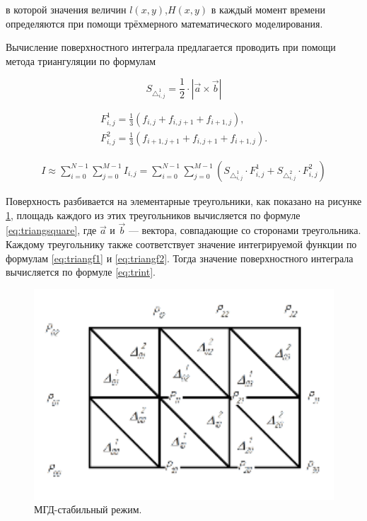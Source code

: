 \documentclass{article}
\begin{document}
в которой значения величин $l(x,y)$,$ H(x,y)$ в каждый момент времени определяются при помощи трёхмерного математического моделирования.

Вычисление поверхностного интеграла предлагается проводить при помощи метода триангуляции по формулам 

\begin{equation}
{S_{\triangle_{i,j}^1}} = \frac{1}{2} \cdot |\overrightarrow{a} \times \overrightarrow{b}|
\end{equation} \label{eq:triangsquare}

\begin{align}
F^1_{i,j} = \frac{1}{3}(f_{i,j}+f_{i,j+1}+f_{i+1,j}), \label{eq:triangf1}\\
F^2_{i,j} = \frac{1}{3}(f_{i+1,j+1}+f_{i,j+1}+f_{i+1,j}). \label{eq:triangf2}
\end{align}

\begin{align}\label{eq:trint}
I \approx \sum_{i=0}^{N-1} \sum_{j=0}^{M-1} I_{i,j} = \sum_{i=0}^{N-1} \sum_{j=0}^{M-1} (S_{\triangle_{i,j}^1} \cdot F_{i,j}^1 + S_{\triangle_{i,j}^2} \cdot F_{i,j}^2)
\end{align}

Поверхность разбивается на элементарные треугольники, как показано на рисунке \ref{fig:triangles}, площадь каждого из этих треугольников вычисляется по формуле \ref{eq:triangsquare}, где $\overrightarrow{a}$ и $\overrightarrow{b}$ — вектора, совпадающие со сторонами треугольника. Каждому треугольнику также соответствует значение интегрируемой функции по формулам \ref{eq:triangf1} и \ref{eq:triangf2}. Тогда значение поверхностного интеграла вычисляется по формуле \ref{eq:trint}.

\begin{figure}[H]
    \centering
    \includegraphics[width=150mm]{triangul.png}
    \caption{МГД-стабильный режим.}
    \label{fig:triangles} 
\end{figure}
\end{document}
